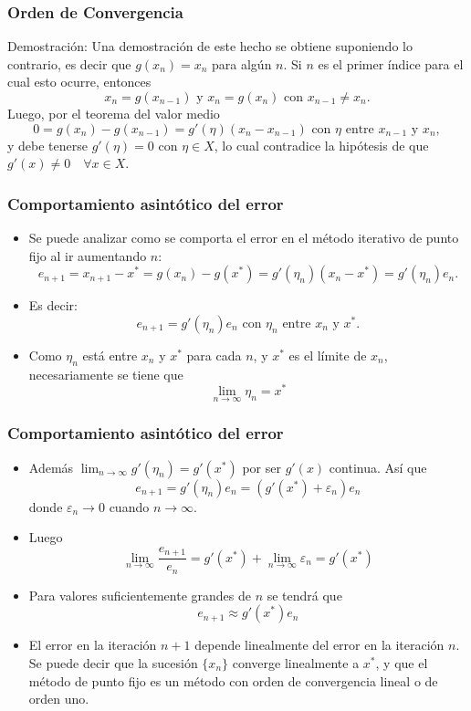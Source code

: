 \documentclass{beamer}
\begin{document}
\begin{frame}
  \frametitle{Orden de Convergencia}
  \begin{block}{Demostraci\'on:}
    Una demostraci\'on de este hecho se obtiene suponiendo lo contrario, es decir que $g(x_n ) =
x_n$ para alg\'un $n$. Si $n$ es el primer \'indice para el cual esto ocurre, entonces
$$
x_n = g(x_{n-1} ) \mbox{ y } x_n = g(x_n ) \mbox{ con } x_{n-1} \neq x_n.
$$
Luego, por el teorema del valor medio
$$
0 = g(x_n ) - g(x_{n-1}) = g'(\eta)(x_n - x_{n-1}) \mbox{ con $\eta$ entre $x_{n-1}$ y $x_n$},
$$
y debe tenerse $g'(\eta) = 0$ con $\eta \in X$, lo cual contradice la hip\'otesis de que $g'(x) \neq 0\quad \forall x \in X$.
  \end{block}
\end{frame}
\begin{frame}
  \frametitle{Comportamiento asint\'otico del error}
  \begin{itemize}
    \item<1-> Se puede analizar como se comporta el error en el m\'etodo iterativo de punto fijo al
ir aumentando $n$:
$$
e_{n+1} = x_{n+1} - x^* = g(x_n) - g(x^*) = g'(\eta_n )(x_n - x^*) = g'(\eta_n)e_n .
$$
\item<2->Es decir:
$$
e_{n+1} = g'(\eta_n )e_n \mbox{ con $\eta_n$ entre $x_n$ y $x^*$} .
$$
\item<3-> Como $\eta_n$ est\'a entre $x_n$ y $x^*$ para cada $n$, y $x^*$ es el l\'imite de $x_n$, necesariamente se tiene que
$$
\lim_{n \to \infty}\eta_n = x^*
$$
  \end{itemize}
\end{frame}
\begin{frame}
  \frametitle{Comportamiento asint\'otico del error}
  \begin{itemize}
    \item<1->Adem\'as $\displaystyle\lim_{n \to \infty}g'(\eta_n) = g'(x^*)$
    por ser $g'(x)$ continua. As\'i que
    $$
    e_{n+1} = g'(\eta_n )e_n = (g'(x^*) +\varepsilon_n)e_n
    $$
    donde $\varepsilon_n \to 0$ cuando $n \to \infty$.
    \item<2->Luego
    $$
    \lim_{n \to \infty}\frac{e_{n+1}}{e_n} = g'(x^*) +\lim_{n \to \infty}\varepsilon_n = g'(x^*)
    $$    
    \item<3-> Para valores suficientemente grandes de $n$ se tendr\'a que
    $$
    e_{n+1} \approx g'(x^*)e_n
    $$    
    \item<4->El error en la iteraci\'on $n + 1$ depende linealmente del error
    en la iteraci\'on $n$. Se puede decir que la sucesi\'on $\{x_n\}$ converge linealmente a $x^*$, y que el
    m\'etodo de punto fijo es un m\'etodo con orden de convergencia lineal o de orden uno.
  \end{itemize}
\end{frame}    
\end{document}
